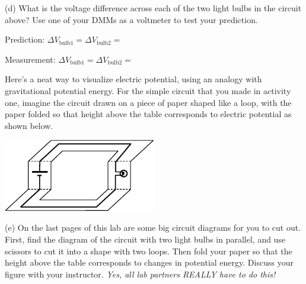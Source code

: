 \begin{center}
 \par
\end{center}


(d) What is the voltage difference across each of the two light bulbs in the circuit above?  Use one of your DMMs as a voltmeter to test your prediction. \par
\vspace{0.1 in}
\hspace{0.5 in} Prediction: \hspace{0.11 in} $\Delta V_{\mathrm{bulb1}} = $\hspace{0.7 in}$ \Delta V_{\mathrm{bulb2}} = $ \par
\vspace{0.2 in}
\hspace{0.5 in} Measurement:  $\Delta V_{\mathrm{bulb1}} = $\hspace{0.7 in}$ \Delta V_{\mathrm{bulb2}} = $ \par
\vspace{0.25 in}

Here's a neat way to visualize electric potential, using an analogy with gravitational potential energy.  For the simple circuit that you made in activity one, imagine the circuit drawn on a piece of paper shaped like a loop, with the paper folded so that height above the table corresponds to electric potential as shown below.
\begin{center}
\includegraphics[width=0.5\textwidth]{electric_circuits/how_to_fold.eps}
\end{center}
\vspace{-0.1in}

(e) On the last pages of this lab are some big circuit diagrams for you to cut out.  First, find the diagram of the circuit with two light bulbs in parallel, and use scissors to cut it into a shape with two loops.  Then fold your paper so that the height above the table corresponds to changes in potential energy.  Discuss your figure with your instructor.  \textit{Yes, all lab partners REALLY have to do this!}
\vspace{0.2 in}

